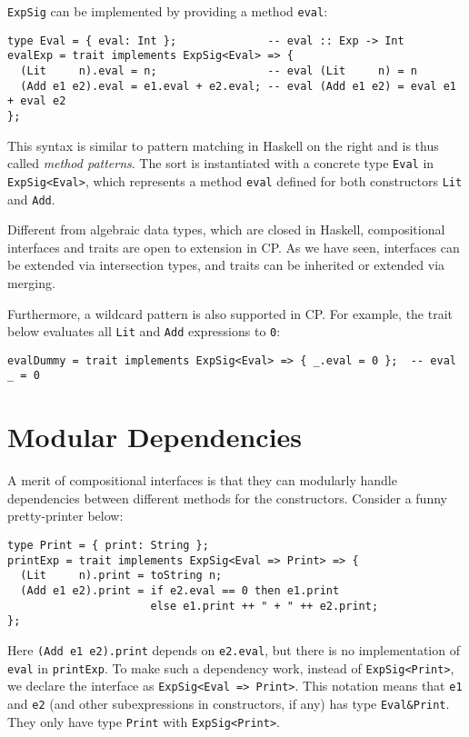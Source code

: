 \lstinline{ExpSig} can be implemented by providing a method \lstinline{eval}:
\begin{lstlisting}
type Eval = { eval: Int };              -- eval :: Exp -> Int
evalExp = trait implements ExpSig<Eval> => {
  (Lit     n).eval = n;                 -- eval (Lit     n) = n
  (Add e1 e2).eval = e1.eval + e2.eval; -- eval (Add e1 e2) = eval e1 + eval e2
};
\end{lstlisting}
This syntax is similar to pattern matching in Haskell on the right and is thus
called \emph{method patterns}. The sort is instantiated with a concrete type
\lstinline{Eval} in \lstinline{ExpSig<Eval>}, which represents a method
\lstinline{eval} defined for both constructors \lstinline{Lit} and
\lstinline{Add}.

\begin{tipblock}
Different from algebraic data types, which are closed in Haskell, compositional
interfaces and traits are open to extension in CP. As we have seen, interfaces
can be extended via intersection types, and traits can be inherited or extended
via merging.
\end{tipblock}

\noindent
Furthermore, a wildcard pattern is also supported in CP. For example, the trait
below evaluates all \lstinline{Lit} and \lstinline{Add} expressions to \lstinline{0}:
\begin{lstlisting}
evalDummy = trait implements ExpSig<Eval> => { _.eval = 0 };  -- eval _ = 0
\end{lstlisting}

\section{Modular Dependencies}

A merit of compositional interfaces is that they can modularly handle
dependencies between different methods for the constructors. Consider a funny
pretty-printer below:
\begin{lstlisting}
type Print = { print: String };
printExp = trait implements ExpSig<Eval => Print> => {
  (Lit     n).print = toString n;
  (Add e1 e2).print = if e2.eval == 0 then e1.print
                      else e1.print ++ " + " ++ e2.print;
};
\end{lstlisting}
Here \lstinline{(Add e1 e2).print} depends on \lstinline{e2.eval}, but there is
no implementation of \lstinline{eval} in \lstinline{printExp}. To make such a
dependency work, instead of \lstinline{ExpSig<Print>}, we declare the interface
as \lstinline{ExpSig<Eval => Print>}. This notation means that \lstinline{e1}
and \lstinline{e2} (and other subexpressions in constructors, if any) has type
\lstinline{Eval&Print}. They only have type \lstinline{Print} with
\lstinline{ExpSig<Print>}.

